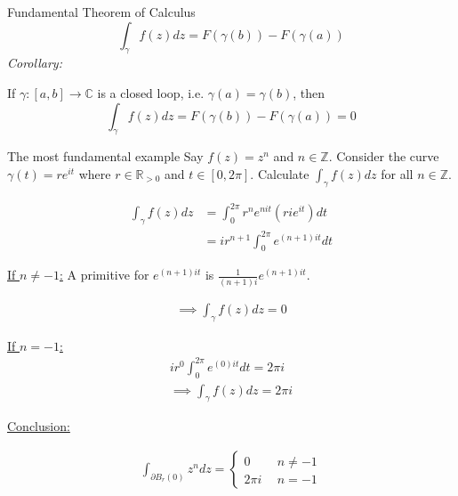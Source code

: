 \documentclass{article}
\begin{document}
\begin{thrm}{Fundamental Theorem of Calculus}{}
    \[
        \int_\gamma f(z) dz = F(\gamma (b)) - F(\gamma (a))
    \]
    \tcbline
    \emph{Corollary:}
    
    If \( \gamma : [a,b]\to \mathbb{C}  \) is a closed loop, i.e. \( \gamma (a) = \gamma (b) \), then 
    \[
        \int _\gamma f(z) dz = F(\gamma (b)) - F(\gamma (a)) = 0
    \]
    \end{thrm}

    \begin{exmp}{The most fundamental example}{}
        Say \( f(z) = z^n \) and \( n \in \mathbb{Z}  \). Consider the curve \( \gamma (t)= re^{it}  \) where \( r \in \mathbb{R} _{>0} \) and \( t \in [0, 2\pi ] \).
        Calculate \( \int _\gamma f(z) dz \) for all \( n \in \mathbb{Z}  \).
        \tcbline
        
        \begin{align*}
            \int _\gamma f(z) dz &= \int_{0}^{2\pi} r^n e^{nit} (rie^{it}) dt \\ 
            &= ir^{n+ 1} \int _0^{2\pi } e^{(n + 1)it} dt
        \end{align*}
        
        \underline{If \( n\neq -1 \):} A primitive for \( e^{(n + 1)it} \)  is \( \frac{1}{(n + 1)i} e^{(n + 1)it}\).
        
        \begin{align*}
            \implies \boxed{\int_\gamma f(z) dz = 0 \tag{$n \neq - 1$}} 
        \end{align*}
        
        \underline{If \( n = -1 \):}
        \begin{align*}
            ir^{0} \int _0^{2\pi } e^{(0)it} dt = 2\pi i\\
            \implies \boxed{\int_\gamma f(z) dz = 2\pi i \tag{$n = - 1$}}
        \end{align*}
        
        \underline{Conclusion:}
        
        \begin{align*}
            \int _{\partial B_r(0)}z^n dz = \begin{cases}
                0 \ \ &n\neq - 1 \\
                2\pi i \ \ &n = - 1
            \end{cases}
        \end{align*}
        
        
        \end{exmp}
        
\end{document}
